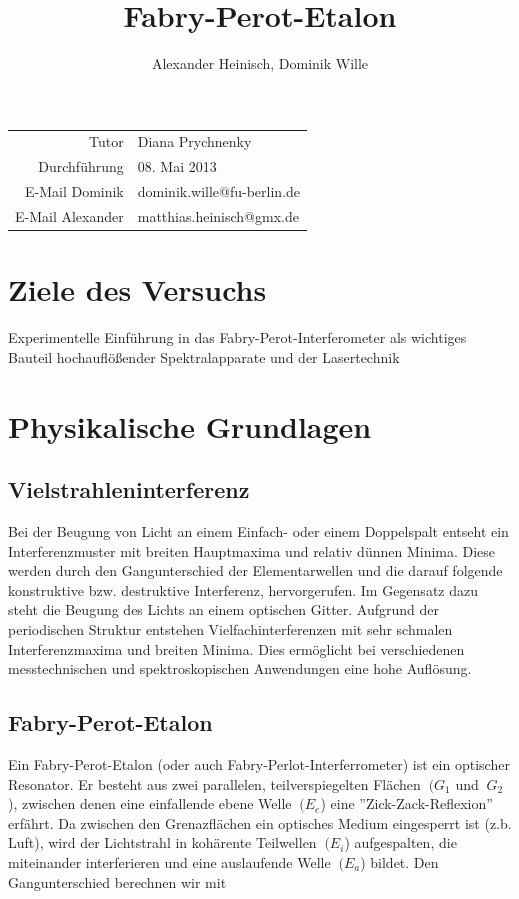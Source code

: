 \documentclass{article}
\title{Fabry-Perot-Etalon}
\author{Alexander Heinisch, Dominik Wille}
\begin{document}
\maketitle
\vspace{13cm}
\noindent
\begin{center}
\begin{tabular}{r l}
Tutor & Diana Prychnenky  \\
Durchführung & 08. Mai 2013 \\

E-Mail Dominik & dominik.wille@fu-berlin.de \\
E-Mail Alexander & matthias.heinisch@gmx.de \\
\end{tabular}
\end{center}

\newpage
\tableofcontents
\newpage

\section{Ziele des Versuchs}
Experimentelle Einführung in das {\sc Fabry-Perot-Interferometer} als wichtiges Bauteil hochauflößender Spektralapparate und der Lasertechnik \\

\section{Physikalische Grundlagen}

\subsection{Vielstrahleninterferenz}
Bei der Beugung von Licht an einem Einfach- oder einem Doppelspalt entseht ein Interferenzmuster mit breiten Hauptmaxima und relativ dünnen Minima. Diese werden durch den Gangunterschied der Elementarwellen und die darauf folgende konstruktive bzw. destruktive Interferenz, hervorgerufen. Im Gegensatz dazu steht die Beugung des Lichts an einem optischen Gitter. Aufgrund der periodischen Struktur entstehen Vielfachinterferenzen mit sehr schmalen Interferenzmaxima und breiten Minima. Dies ermöglicht bei verschiedenen messtechnischen und spektroskopischen Anwendungen eine hohe Auflösung. 

\subsection{Fabry-Perot-Etalon}
Ein Fabry-Perot-Etalon (oder auch Fabry-Perlot-Interferrometer) ist ein optischer Resonator. Er besteht aus zwei parallelen, teilverspiegelten Flächen \(\ (G_{1} \) und \(\ G_{2} \)), zwischen denen eine einfallende ebene Welle \(\ (E_{e} \)) eine ''Zick-Zack-Reflexion'' erfährt. Da zwischen den Grenazflächen ein optisches Medium eingesperrt ist (z.b. Luft), wird der Lichtstrahl in kohärente Teilwellen \(\ (E_{i} \)) aufgespalten, die miteinander interferieren und eine auslaufende Welle \(\ (E_{a} \)) bildet. Den Gangunterschied berechnen wir mit
\end{document}
